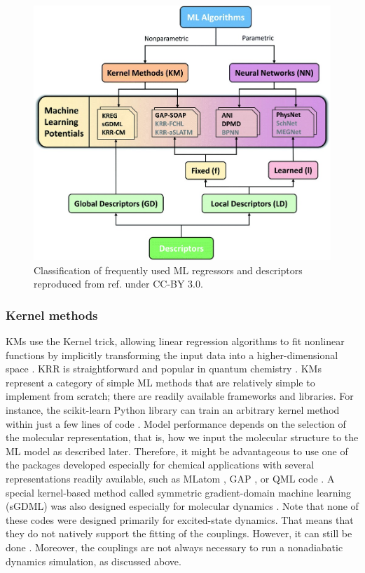 \documentclass[9pt,bestpractices]{livecoms}
\begin{document}
\begin{figure}[hbt!]
\centering
\includegraphics[width=0.7\linewidth]{figures/ML_potential_Pinheiro2021.jpeg}
\caption{Classification of frequently used ML regressors and descriptors reproduced from ref. \cite{RN39} under CC-BY 3.0.}
\label{fig:potentials}
\end{figure}

\subsubsection{Kernel methods}
\label{sec:kernel}
KMs use the Kernel trick, allowing linear regression algorithms to fit nonlinear functions by implicitly transforming the input data into a higher-dimensional space \cite{RN38}. KRR is straightforward and popular in quantum chemistry \cite{RN123, RN37}. KMs represent a category of simple ML methods that are relatively simple to implement from scratch; there are readily available frameworks and libraries. For instance, the scikit-learn Python library can train an arbitrary kernel method within just a few lines of code \cite{RN148}. Model performance depends on the selection of the molecular representation, that is, how we input the molecular structure to the ML model as described later. Therefore, it might be advantageous to use one of the packages developed especially for chemical applications with several representations readily available, such as MLatom \cite{RN123, RN151, RN122}, GAP \cite{RN35, RN34}, or QML code \cite{RN36}. A special kernel-based method called symmetric gradient-domain machine learning (sGDML) was also designed especially for molecular dynamics \cite{RN109, RN153, Chmiela2023}. Note that none of these codes were designed primarily for excited-state dynamics. That means that they do not natively support the fitting of the couplings. However, it can still be done \cite{RN102}. Moreover, the couplings are not always necessary to run a nonadiabatic dynamics simulation, as discussed above.
\end{document}
